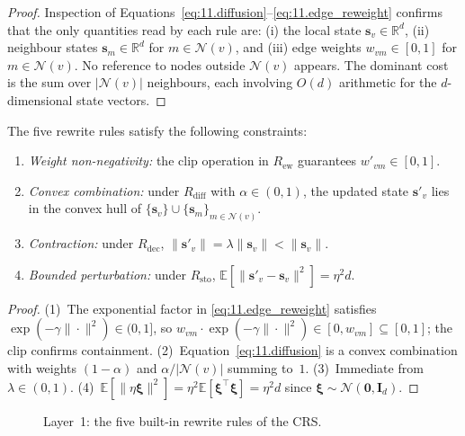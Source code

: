 \begin{proof}
Inspection of Equations~\eqref{eq:11.diffusion}--\eqref{eq:11.edge_reweight}
confirms that the only quantities read by each rule are:
(i) the local state $\mathbf{s}_v \in \mathbb{R}^d$,
(ii) neighbour states $\mathbf{s}_m \in \mathbb{R}^d$ for
$m \in \mathcal{N}(v)$, and
(iii) edge weights $w_{vm} \in [0,1]$ for $m \in \mathcal{N}(v)$.
No reference to nodes outside $\mathcal{N}(v)$ appears.  The dominant
cost is the sum over $|\mathcal{N}(v)|$ neighbours, each involving
$O(d)$ arithmetic for the $d$-dimensional state vectors.
\end{proof}

\begin{lemma}
\label{lem:11.2}
The five rewrite rules satisfy the following constraints:
\begin{enumerate}
  \item \emph{Weight non-negativity:} the $\mathrm{clip}$ operation in
    $R_{\mathrm{ew}}$ guarantees $w'_{vm} \in [0,1]$.
  \item \emph{Convex combination:} under $R_{\mathrm{diff}}$ with
    $\alpha \in (0,1)$, the updated state $\mathbf{s}'_v$ lies in the
    convex hull of $\{\mathbf{s}_v\} \cup
    \{\mathbf{s}_m\}_{m \in \mathcal{N}(v)}$.
  \item \emph{Contraction:} under $R_{\mathrm{dec}}$,
    $\|\mathbf{s}'_v\| = \lambda \|\mathbf{s}_v\| < \|\mathbf{s}_v\|$.
  \item \emph{Bounded perturbation:} under $R_{\mathrm{sto}}$,
    $\mathbb{E}[\|\mathbf{s}'_v - \mathbf{s}_v\|^2] = \eta^2 d$.
\end{enumerate}
\end{lemma}

\begin{proof}
(1)~The exponential factor in \eqref{eq:11.edge_reweight} satisfies
$\exp(-\gamma\|\cdot\|^2) \in (0,1]$, so $w_{vm} \cdot
\exp(-\gamma\|\cdot\|^2) \in [0, w_{vm}] \subseteq [0,1]$; the
$\mathrm{clip}$ confirms containment.
(2)~Equation~\eqref{eq:11.diffusion} is a convex combination with
weights $(1-\alpha)$ and $\alpha/|\mathcal{N}(v)|$ summing to~$1$.
(3)~Immediate from $\lambda \in (0,1)$.
(4)~$\mathbb{E}[\|\eta\boldsymbol{\xi}\|^2] = \eta^2
\mathbb{E}[\boldsymbol{\xi}^\top\boldsymbol{\xi}] = \eta^2 d$
since $\boldsymbol{\xi} \sim \mathcal{N}(\mathbf{0}, \mathbf{I}_d)$.
\end{proof}

\begin{figure}[t]
\centering
{}
\caption{Layer~1: the five built-in rewrite rules of the CRS.}
\label{fig:c11:rewrite}
\end{figure}


